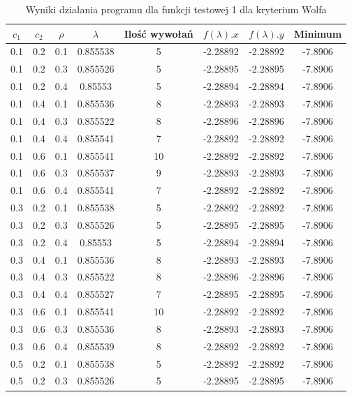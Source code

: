 \documentclass{classrep}
\begin{document}
\begin{table}
  \centering
  \caption{Wyniki działania programu dla funkcji testowej 1 dla kryterium Wolfa}
  \label{wolf1}
  \begin{tabular}{|c|c|c|c|c|c|c|c|}
    \hline
    $c_1$ & $c_2$ & $\rho$ & $\lambda$ & Ilość wywołań & $f(\lambda).x$ & $f(\lambda).y$ & Minimum \\
    \hline
    0.1 & 0.2 & 0.1 & 0.855538 & 5 & -2.28892 & -2.28892 & -7.8906 \\
    0.1 & 0.2 & 0.3 & 0.855526 & 5 & -2.28895 & -2.28895 & -7.8906 \\
    0.1 & 0.2 & 0.4 & 0.85553 & 5 & -2.28894 & -2.28894 & -7.8906 \\
    0.1 & 0.4 & 0.1 & 0.855536 & 8 & -2.28893 & -2.28893 & -7.8906 \\
    0.1 & 0.4 & 0.3 & 0.855522 & 8 & -2.28896 & -2.28896 & -7.8906 \\
    0.1 & 0.4 & 0.4 & 0.855541 & 7 & -2.28892 & -2.28892 & -7.8906 \\
    0.1 & 0.6 & 0.1 & 0.855541 & 10 & -2.28892 & -2.28892 & -7.8906 \\
    0.1 & 0.6 & 0.3 & 0.855537 & 9 & -2.28893 & -2.28893 & -7.8906 \\
    0.1 & 0.6 & 0.4 & 0.855541 & 7 & -2.28892 & -2.28892 & -7.8906 \\
    0.3 & 0.2 & 0.1 & 0.855538 & 5 & -2.28892 & -2.28892 & -7.8906 \\
    0.3 & 0.2 & 0.3 & 0.855526 & 5 & -2.28895 & -2.28895 & -7.8906 \\
    0.3 & 0.2 & 0.4 & 0.85553 & 5 & -2.28894 & -2.28894 & -7.8906 \\
    0.3 & 0.4 & 0.1 & 0.855536 & 8 & -2.28893 & -2.28893 & -7.8906 \\
    0.3 & 0.4 & 0.3 & 0.855522 & 8 & -2.28896 & -2.28896 & -7.8906 \\
    0.3 & 0.4 & 0.4 & 0.855527 & 7 & -2.28895 & -2.28895 & -7.8906 \\
    0.3 & 0.6 & 0.1 & 0.855541 & 10 & -2.28892 & -2.28892 & -7.8906 \\
    0.3 & 0.6 & 0.3 & 0.855536 & 8 & -2.28893 & -2.28893 & -7.8906 \\
    0.3 & 0.6 & 0.4 & 0.855539 & 8 & -2.28892 & -2.28892 & -7.8906 \\
    0.5 & 0.2 & 0.1 & 0.855538 & 5 & -2.28892 & -2.28892 & -7.8906 \\
    0.5 & 0.2 & 0.3 & 0.855526 & 5 & -2.28895 & -2.28895 & -7.8906 \\

\end{tabular}
\end{table}
\end{document}
